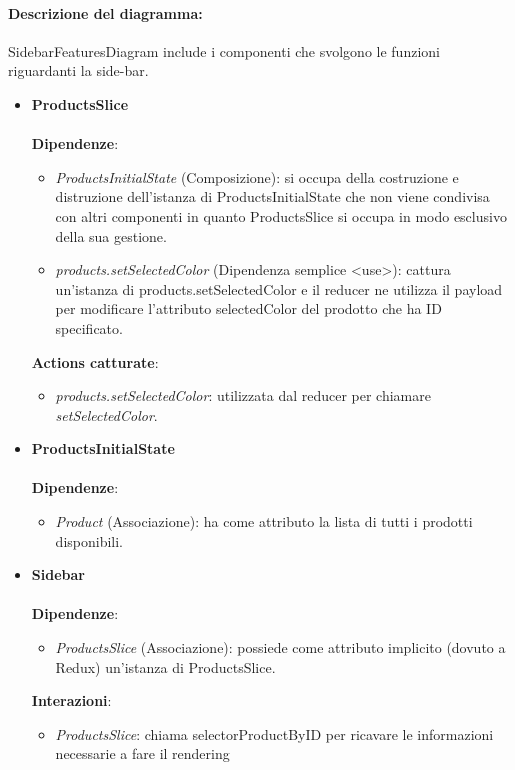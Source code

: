 	\paragraph*{Descrizione del diagramma:}
	SidebarFeaturesDiagram include i componenti che svolgono le funzioni riguardanti la side-bar.
\begin{itemize}
		\item \textbf{ProductsSlice}
		\\\\
		\textbf{Dipendenze}:
		\begin{itemize}
			\item \textit{ProductsInitialState} (Composizione): si occupa della costruzione e distruzione dell'istanza di ProductsInitialState
			che non viene condivisa con altri componenti in quanto ProductsSlice si occupa in modo esclusivo della sua gestione.
			\item \textit{products.setSelectedColor} (Dipendenza semplice \textless use\textgreater): cattura un'istanza di products.setSelectedColor e il 
			reducer ne utilizza il payload per modificare l'attributo selectedColor del prodotto che ha ID specificato.
		\end{itemize}
		\textbf{Actions catturate}:
		\begin{itemize}
			\item \textit{products.setSelectedColor}: utilizzata dal reducer per chiamare \textit{setSelectedColor}.
		\end{itemize}
		\item \textbf{ProductsInitialState}
		\\\\
		\textbf{Dipendenze}:
		\begin{itemize}
			\item \textit{Product} (Associazione): ha come attributo la lista di tutti i prodotti disponibili.
		\end{itemize}
		\item \textbf{Sidebar}
		\\\\
		\textbf{Dipendenze}:
		\begin{itemize}
			\item \textit{ProductsSlice} (Associazione): possiede come attributo implicito (dovuto a Redux) un'istanza di ProductsSlice.
		\end{itemize}
		\textbf{Interazioni}:
		\begin{itemize}
			\item \textit{ProductsSlice}: chiama selectorProductByID per ricavare le informazioni necessarie a fare il rendering

\end{itemize}
\end{itemize}
